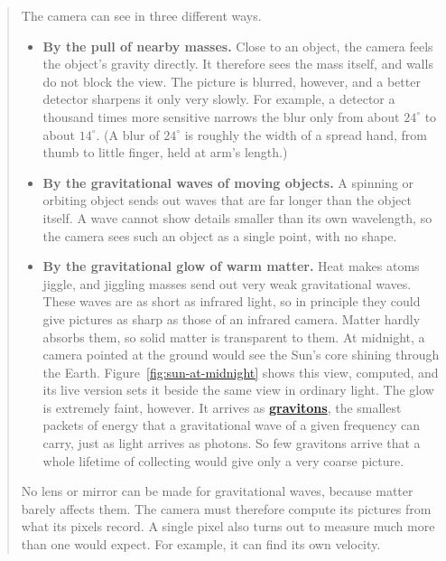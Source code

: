 \begin{quote}
The camera can see in three different ways.
\begin{itemize}
\item \textbf{By the pull of nearby masses.} Close to an object, the camera
feels the object's gravity directly. It therefore sees the mass itself, and
walls do not block the view. The picture is blurred, however, and a better
detector sharpens it only very slowly. For example, a detector a thousand times
more sensitive narrows the blur only from about $24^\circ$ to about $14^\circ$.
(A blur of $24^\circ$ is roughly the width of a spread hand, from thumb to little finger, held at
arm's length.)
\item \textbf{By the gravitational waves of moving objects.} A spinning or
orbiting object sends out waves that are far longer than the object itself. A
wave cannot show details smaller than its own wavelength, so the camera sees
such an object as a single point, with no shape.
\item \textbf{By the gravitational glow of warm matter.} Heat makes atoms
jiggle, and jiggling masses send out very weak gravitational waves. These waves
are as short as infrared light, so in principle they could give pictures as
sharp as those of an infrared camera. Matter hardly absorbs them, so solid
matter is transparent to them. At midnight, a camera pointed at the ground
would see the Sun's core shining through the Earth. Figure~\ref{fig:sun-at-midnight} shows this view, computed, and its live version sets it beside the same view in ordinary light. The glow is extremely
faint, however. It arrives as
\textbf{\href{https://en.wikipedia.org/wiki/Graviton}{gravitons}}, the smallest
packets of energy that a gravitational wave of a given frequency can carry, just as light arrives as
photons. So few gravitons arrive that a whole lifetime of collecting would give
only a very coarse picture.
\end{itemize}

No lens or mirror can be made for gravitational waves, because matter barely
affects them. The camera must therefore compute its pictures from what its
pixels record. A single pixel also turns out to measure much more than one
would expect. For example, it can find its own velocity.


\end{quote}

